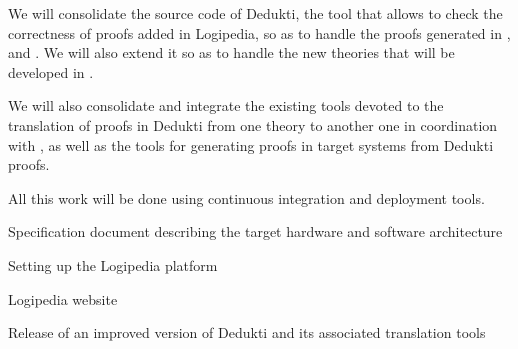 \begin{workpackage}[id=access,type=RTD,wphases=1-48,
  short=Access,%
  title={Access},
  lead=Inr,InrRM=48,OcaRM=6,EduRM=12]
\begin{tasklist}
  \begin{task}[id=dedukti,
      title=Development of Dedukti checking and translation tools,
      shorttitle=Dev.,
      lead=Inr,InrRM=18,wphases=13-36] We will consolidate the source
    code of Dedukti, the tool that allows to check the correctness of
    proofs added in Logipedia, so as to handle the proofs generated in
    ,  and . We
    will also extend it so as to handle the new theories that will be
    developed in .

    We will also consolidate and integrate the existing tools devoted
    to the translation of proofs in Dedukti from one theory to another
    one in coordination with , as well as the tools
    for generating proofs in target systems from Dedukti proofs.
    
    All this work will be done using continuous integration and
    deployment tools.
  \end{task}
  
\end{tasklist}


\begin{wpdelivs}

  
  \begin{wpdeliv}[due=6,id=archi,dissem=PU,nature=DEM,lead=Inr,task=infra]{Specification document describing the target hardware and software architecture}\end{wpdeliv}

  \begin{wpdeliv}[due=12,id=platform,dissem=PU,nature=DEC,lead=Inr,task=infra]{Setting up the Logipedia platform}\end{wpdeliv}

  \begin{wpdeliv}[due=24,miles=platform,id=web,dissem=PU,nature=DEC,lead=Inr,task=web]{Logipedia website}\end{wpdeliv}

  \begin{wpdeliv}[due=24,id=dedukti,dissem=PU,nature=OTHER,lead=Inr,task=dedukti]{Release of an improved version of Dedukti and its associated translation tools}\end{wpdeliv}


\end{wpdelivs}
\end{workpackage}
